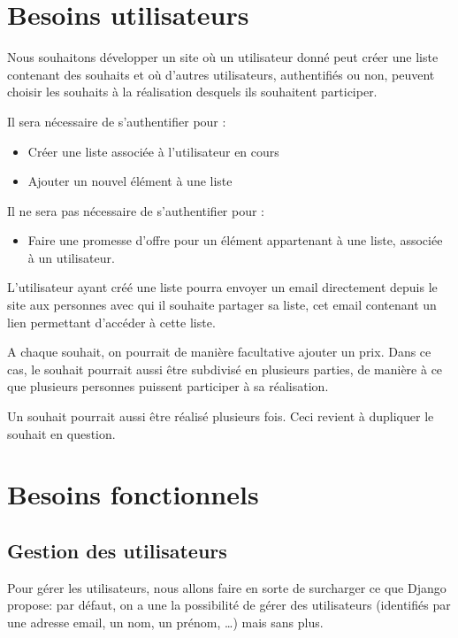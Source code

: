 \documentclass[11pt]{amsbook}
\begin{document}
\hypertarget{x-besoins-utilisateurs}{\chapter{Besoins utilisateurs}}
Nous souhaitons développer un site où un utilisateur donné peut créer une liste contenant des souhaits et où d’autres utilisateurs, authentifiés ou non, peuvent choisir les souhaits à la réalisation desquels ils souhaitent participer.


Il sera nécessaire de s’authentifier pour :


\begin{itemize}

\item Créer une liste associée à l’utilisateur en cours

\item Ajouter un nouvel élément à une liste

\end{itemize}


Il ne sera pas nécessaire de s’authentifier pour :


\begin{itemize}

\item Faire une promesse d’offre pour un élément appartenant à une liste, associée à un utilisateur.

\end{itemize}


L’utilisateur ayant créé une liste pourra envoyer un email directement depuis le site aux personnes avec qui il souhaite partager sa liste, cet email contenant un lien permettant d’accéder à cette liste.


A chaque souhait, on pourrait de manière facultative ajouter un prix. Dans ce cas, le souhait pourrait aussi être subdivisé en plusieurs parties, de manière à ce que plusieurs personnes puissent participer à sa réalisation.


Un souhait pourrait aussi être réalisé plusieurs fois. Ceci revient à dupliquer le souhait en question.


\hypertarget{x-besoins-fonctionnels}{\chapter{Besoins fonctionnels}}
\hypertarget{x-gestion-des-utilisateurs}{\section{Gestion des utilisateurs}}
Pour gérer les utilisateurs, nous allons faire en sorte de surcharger ce que Django propose: par défaut, on a une la possibilité de gérer des utilisateurs (identifiés par une adresse email, un nom, un prénom, …​) mais sans plus.
\end{document}
